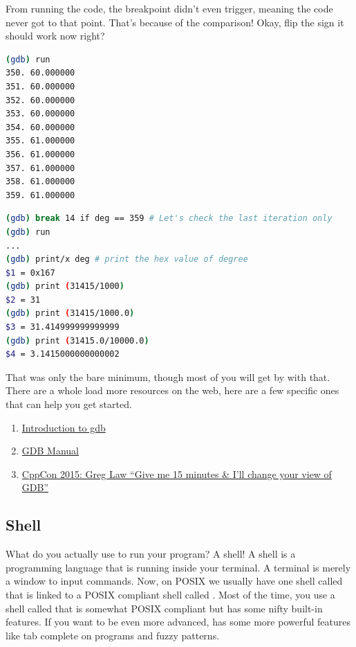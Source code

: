 From running the code, the breakpoint didn't even trigger, meaning the code never got to that point.
That’s because of the comparison!
Okay, flip the sign it should work now right?

\begin{lstlisting}[language=bash]
(gdb) run
350. 60.000000
351. 60.000000
352. 60.000000
353. 60.000000
354. 60.000000
355. 61.000000
356. 61.000000
357. 61.000000
358. 61.000000
359. 61.000000

\end{lstlisting}

\begin{lstlisting}[language=bash]
(gdb) break 14 if deg == 359 # Let's check the last iteration only
(gdb) run
...
(gdb) print/x deg # print the hex value of degree
$1 = 0x167
(gdb) print (31415/1000)
$2 = 31
(gdb) print (31415/1000.0)
$3 = 31.414999999999999
(gdb) print (31415.0/10000.0)
$4 = 3.1415000000000002

\end{lstlisting}

That was only the bare minimum, though most of you will get by with that.
There are a whole load more resources on the web, here are a few specific ones that can help you get started.

\begin{enumerate}
\item \href{http://www.cs.cmu.edu/~gilpin/tutorial/}{Introduction to gdb}
\item \href{https://ftp.gnu.org/old-gnu/Manuals/gdb/html_node/gdb_toc.html}{GDB Manual}
\item \href{https://www.youtube.com/watch?v=PorfLSr3DDI}{CppCon 2015: Greg Law “Give me 15 minutes \& I'll change your view of GDB”}
\end{enumerate}

\subsection{Shell}

What do you actually use to run your program? A shell! A shell is a programming language that is running inside your terminal. A terminal is merely a window to input commands. Now, on POSIX we usually have one shell called  that is linked to a POSIX compliant shell called . Most of the time, you use a shell called  that is somewhat POSIX compliant but has some nifty built-in features. If you want to be even more advanced,  has some more powerful features like tab complete on programs and fuzzy patterns.

